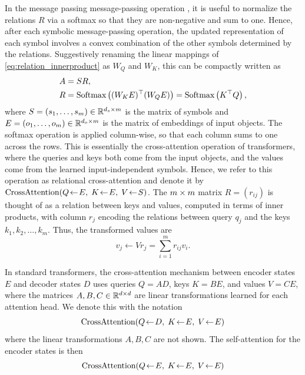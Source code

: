 In the message passing message-passing operation , it is useful to normalize the relations $R$ via a softmax so that they are non-negative and sum to one. Hence, after each symbolic message-passing operation, the updated representation of each symbol involves a convex combination of the other symbols determined by the relations. Suggestively renaming the linear mappings of \eqref{eq:relation_innerproduct} as $W_Q$ and $W_K$, this can be compactly written as
\begin{equation}
    \label{eq:relational_crossattention}
    \begin{split}
        A &= S R, \\
        R &= \Softmax\left((W_K E)^\top (W_Q E)\right) = \Softmax\left(K^\top Q\right),
    \end{split}
\end{equation}
where $S = (s_1, \ldots, s_m) \in \mathbb{R}^{d_s \times m}$ is the matrix of symbols and $E
= (o_1, \ldots, o_m) \in \mathbb{R}^{d_o \times m}$ is the matrix of embeddings of input objects. 
The softmax operation is applied column-wise, so that each column sums to one across the rows.
This is essentially the cross-attention operation of transformers, where the queries and keys both come from the input objects, and the values come from the learned input-independent symbols. Hence, we refer to this operation as relational cross-attention and denote it by $\mbox{CrossAttention}(Q\!\leftarrow\!E,\; K\!\leftarrow\!E,\; V\!\leftarrow\!S)$. 
The $m\times m$ matrix $R = (r_{ij})$ is thought of 
as a relation between keys and values, computed in terms of inner products, with column $r_j$ 
encoding the relations between query $q_j$ and the keys $k_1, k_2, \ldots, k_m$. Thus, the transformed 
values are 
\begin{equation*}
    v_j \leftarrow V r_j = \sum_{i=1}^m r_{ij} v_i .
\end{equation*}

In standard transformers, the cross-attention mechanism between encoder states $E$ and decoder states $D$
uses queries $Q = AD$, keys $K = BE$, and values $V = CE$, where the matrices $A,B,C \in\mathbb{R}^{d\times d}$ are
linear transformations learned for each attention head.  We denote this with the notation
\begin{equation*}
     \qkv{D}{E}{E}
\end{equation*}
where the linear transformations $A, B, C$ are not shown. The self-attention for the encoder
states is then
\begin{equation*}
    \qkv{E}{E}{E}
\end{equation*}

